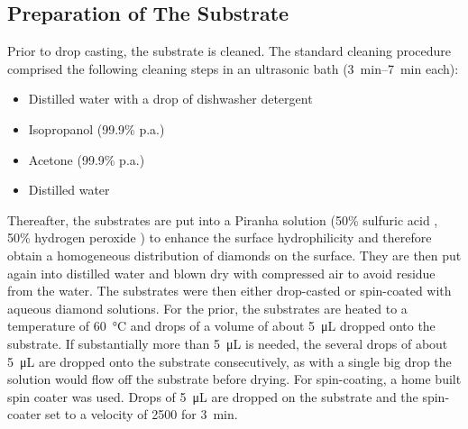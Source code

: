 	\subsection{Preparation of The Substrate}

	Prior to drop casting, the substrate is cleaned.
	The standard cleaning procedure comprised the following cleaning steps in an ultrasonic bath (\SIrange{3}{7}{\minute} each):
	\begin{itemize}
		\item Distilled water with a drop of dishwasher detergent
		\item Isopropanol (99.9\% p.a.)
		\item Acetone (99.9\% p.a.)
		\item Distilled water
	\end{itemize}
	Thereafter, the substrates are put into a Piranha solution (50\% sulfuric acid , 50\% hydrogen peroxide ) to enhance the surface hydrophilicity and therefore obtain a homogeneous distribution of diamonds on the surface.
	They are then put again into distilled water and blown dry with compressed air to avoid residue from the water.
	The substrates were then either drop-casted or spin-coated with aqueous diamond solutions.
	For the prior, the substrates are heated to a temperature of \SI{60}{\celsius} and drops of a volume of about \SI{5}{\micro\liter} dropped onto the substrate.
	If substantially more than \SI{5}{\micro\liter} is needed, the several drops of about \SI{5}{\micro\liter} are dropped onto the substrate consecutively, as with a single big drop the solution would flow off the substrate before drying.
	For spin-coating, a home built spin coater was used.
	Drops of \SI{5}{\micro\liter} are dropped on the substrate and the spin-coater set to a velocity of \SI{2500}{\rpm} for \SI{3}{\minute}.
